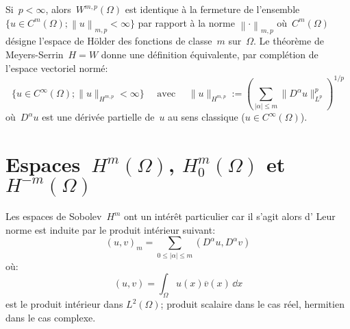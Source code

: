 \medskip{}
Si~$p<\infty$, alors~$W^{m,p}(\Omega)$ est identique à la fermeture de l'ensemble $\lbrace u \in C^m(\Omega) ; \left\|u \right\|_{m,p} < \infty \rbrace$ par rapport à la norme $\left\|\cdot\right\|_{m,p}$ où~$C^m(\Omega)$ désigne l'espace de Hölder des fonctions de
classe~$m$ sur~$\Omega$.
\medskipvm
Le théorème de Meyers-Serrin~$H=W$ donne une définition équivalente, par complétion de l'espace vectoriel normé:
\begin{equation}
\{u\in C^\infty(\Omega);\| u \|_{H^{m, p}} < \infty\}\quad\text{ avec }\quad
\| u \|_{H^{m, p}}:= \left( \sum_{| \alpha | \leqslant m} \| D^{\alpha} u \|_{L^{p}}^p \right)^{1/p}
\end{equation}
où~$D^\alpha u$ est une dérivée partielle de~$u$ au sens classique ($u \in C^\infty(\Omega)$).


\medskip
\section{Espaces~$H^m(\Omega)$, $H^m_0(\Omega)$ et~$H^{-m}(\Omega)$}

\begin{definition}\label{Th-Hm}
\end{definition}

\medskip
Les espaces de Sobolev~$H^m$ ont un intérêt particulier car il s'agit alors d'
Leur norme est induite par le produit intérieur suivant:
\begin{equation}(u,v)_{m} =\sum \limits _{0 \leqslant \vert \alpha\vert\leqslant m} \left( D^{\alpha} u, D^{\alpha} v\right)
\end{equation}
où: 
\begin{equation}(u,v) = \int_{\Omega} u(x) \overline{v}(x)\, \dd x
\end{equation}
est le produit intérieur dans $L^{2} ( \Omega)$; produit scalaire dans le cas réel, hermitien dans le cas complexe.


